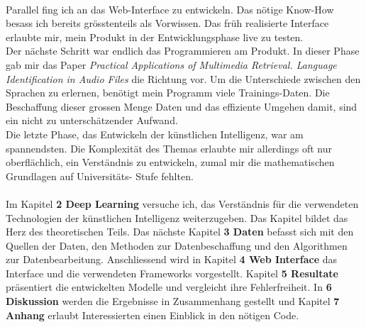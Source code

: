 \\
Parallel fing ich an das Web-Interface zu entwickeln. Das nötige Know-How besass ich bereits grösstenteils als Vorwissen. Das früh realisierte Interface erlaubte mir, mein Produkt in der Entwicklungsphase live zu testen. 
\\
Der nächste Schritt war endlich das Programmieren am Produkt. In dieser Phase gab mir das Paper \textit{Practical Applications of Multimedia Retrieval. Language Identification in Audio
Files}\parencite{iLID} die Richtung vor. 
Um die Unterschiede zwischen den Sprachen zu erlernen, benötigt mein Programm viele Trainings-Daten. Die Beschaffung dieser grossen Menge Daten und das effiziente Umgehen damit, sind ein nicht zu unterschätzender Aufwand. 
\\
Die letzte Phase, das Entwickeln der künstlichen Intelligenz, war am spannendsten. Die Komplexität des Themas erlaubte mir allerdings oft nur oberflächlich, ein Verständnis zu entwickeln, zumal mir die mathematischen Grundlagen auf Universitäts- Stufe fehlten. 
\\ \\
Im Kapitel \textbf{2 Deep Learning} versuche ich, das Verständnis für die verwendeten Technologien der künstlichen Intelligenz weiterzugeben. Das Kapitel bildet das Herz des theoretischen Teils. Das nächste Kapitel \textbf{3
Daten} befasst sich mit den Quellen der Daten, den Methoden zur Datenbeschaffung und den Algorithmen zur Datenbearbeitung. Anschliessend wird in Kapitel \textbf{4 Web Interface} das Interface und
die verwendeten Frameworks vorgestellt. Kapitel \textbf{5 Resultate} präsentiert die entwickelten Modelle und vergleicht ihre Fehlerfreiheit. In \textbf{6 Diskussion} werden die
Ergebnisse in Zusammenhang gestellt und Kapitel \textbf{7 Anhang} erlaubt Interessierten einen Einblick in den nötigen Code.

